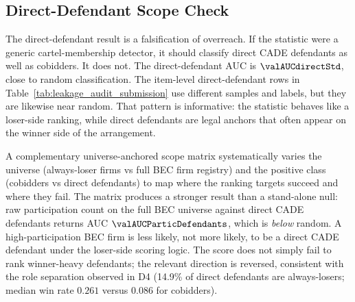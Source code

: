\subsection{Direct-Defendant Scope Check}
\label{app:direct_scope_submission}

The direct-defendant result is a falsification of overreach. If
the statistic were a generic cartel-membership detector, it
should classify direct CADE defendants as well as cobidders. It
does not. The direct-defendant AUC is $\valAUCdirectStd$, close
to random classification. The item-level direct-defendant rows
in Table~\ref{tab:leakage_audit_submission} use different
samples and labels, but they are likewise near random. That
pattern is informative: the
statistic behaves like a loser-side ranking, while direct
defendants are legal anchors that often appear on the winner side
of the arrangement.

A complementary universe-anchored scope matrix systematically
varies the universe (always-loser firms vs full BEC firm registry)
and the positive class (cobidders vs direct defendants) to map
where the ranking targets succeed and where they fail. The matrix
produces a stronger result than a stand-alone null: raw
participation count on the full BEC universe against direct CADE
defendants returns AUC $\valAUCParticDefendants$, which is
\emph{below} random. A high-participation BEC firm is less likely,
not more likely, to be a direct CADE defendant under the
loser-side scoring logic. The score does not simply fail to rank
winner-heavy defendants; the relevant direction is reversed,
consistent with the role separation observed in D4 (14.9\% of
direct defendants are always-losers; median win rate $0.261$
versus $0.086$ for cobidders).

